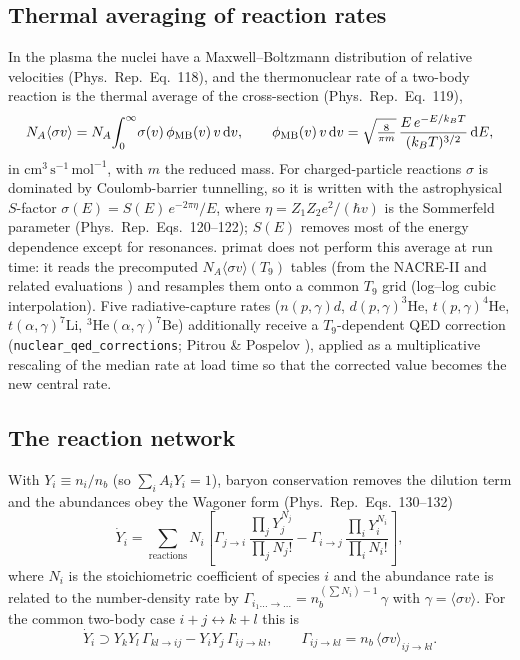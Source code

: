 \documentclass[11pt,a4paper]{article}
\newcommand{\dd}{\mathrm{d}}
\newcommand{\sigmav}{\langle\sigma v\rangle}
\newcommand{\code}[1]{\texttt{#1}}
\newcommand{\PR}{Phys.\ Rep.}
\newcommand{\NA}{N_A}
\begin{document}
\subsection{Thermal averaging of reaction rates}
In the plasma the nuclei have a Maxwell--Boltzmann distribution of relative
velocities (\PR\ Eq.~118), and the thermonuclear rate of a two-body reaction is
the thermal average of the cross-section (\PR\ Eq.~119),
\begin{equation}
  \NA\sigmav = \NA\!\int_0^\infty\!\sigma(v)\,\phi_{\rm MB}(v)\,v\,\dd v,
  \qquad
  \phi_{\rm MB}(v)\,v\,\dd v = \sqrt{\tfrac{8}{\pi m}}\,
     \frac{E\,e^{-E/k_BT}}{(k_BT)^{3/2}}\,\dd E,
\label{eq:thermalavg}
\end{equation}
in $\mathrm{cm^3\,s^{-1}\,mol^{-1}}$, with $m$ the reduced mass. For
charged-particle reactions $\sigma$ is dominated by Coulomb-barrier tunnelling,
so it is written with the astrophysical $S$-factor
$\sigma(E)=S(E)\,e^{-2\pi\eta}/E$, where $\eta=Z_1Z_2 e^2/(\hbar v)$ is the
Sommerfeld parameter (\PR\ Eqs.~120--122); $S(E)$ removes most of the energy
dependence except for resonances. primat does not perform this average at run
time: it reads the precomputed $\NA\sigmav(T_9)$ tables (from the NACRE-II and
related evaluations \cite{NACRE2,Coc2012}) and resamples them onto a common $T_9$
grid (log--log cubic interpolation). Five radiative-capture rates
($n(p,\gamma)d$, $d(p,\gamma)^3$He, $t(p,\gamma)^4$He, $t(\alpha,\gamma)^7$Li,
$^3$He$(\alpha,\gamma)^7$Be) additionally receive a $T_9$-dependent QED
correction (\code{nuclear\_qed\_corrections}; Pitrou \& Pospelov
\cite{PitrouPospelov2020}), applied as a multiplicative rescaling of the median
rate at load time so that the corrected value becomes the new central rate.

\subsection{The reaction network}
With $Y_i\equiv n_i/n_b$ (so $\sum_i A_iY_i=1$), baryon conservation removes the
dilution term and the abundances obey the Wagoner form (\PR\ Eqs.~130--132)
\begin{equation}
  \dot Y_{i} = \sum_{\text{reactions}} N_i\!\left[
      \Gamma_{\!j\to i}\,
      \frac{\textstyle\prod_j Y_j^{N_j}}{\textstyle\prod_j N_j!}
    - \Gamma_{\!i\to j}\,
      \frac{\textstyle\prod_i Y_i^{N_i}}{\textstyle\prod_i N_i!}\right],
\label{eq:network}
\end{equation}
where $N_i$ is the stoichiometric coefficient of species $i$ and the abundance
rate is related to the number-density rate by
$\Gamma_{i_1\dots\to\dots}=n_b^{(\sum N_i)-1}\,\gamma$ with
$\gamma=\sigmav$. For the common two-body case $i+j\leftrightarrow k+l$ this is
\begin{equation}
  \dot Y_i \supset Y_kY_l\,\Gamma_{kl\to ij} - Y_iY_j\,\Gamma_{ij\to kl},
  \qquad \Gamma_{ij\to kl}=n_b\,\sigmav_{ij\to kl}.
\end{equation}
\end{document}

